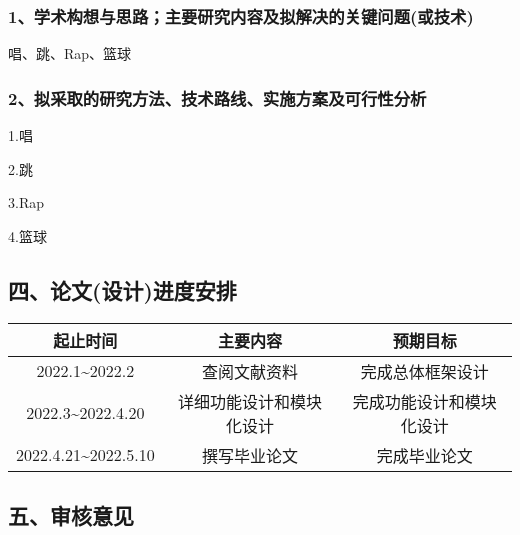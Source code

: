 \documentclass[UTF8,zihao=-4]{oucart}
\begin{document}
    \begin{framed}


        \subsubsection*{1、学术构想与思路；主要研究内容及拟解决的关键问题(或技术)}

        唱、跳、Rap、篮球

        \subsubsection*{2、拟采取的研究方法、技术路线、实施方案及可行性分析}

        1.唱

        2.跳

        3.Rap

        4.篮球
    \end{framed}

    \newpage

    \subsection*{四、论文(设计)进度安排}

    \noindent
    \begin{tabular}{|c|c|c|}
        \hline
        起止时间                   & 主要内容         & 预期目标         \\
        \hline
        2022.1\~{}2022.2       & 查阅文献资料       & 完成总体框架设计     \\
        \hline
        2022.3\~{}2022.4.20    & 详细功能设计和模块化设计 & 完成功能设计和模块化设计 \\
        \hline
        2022.4.21\~{}2022.5.10 & 撰写毕业论文       & 完成毕业论文       \\
        \hline
    \end{tabular}

    \subsection*{五、审核意见}

    \begin{framed}
        \vspace{50mm}
        \begin{flushright}
            \par
            \makebox[10mm]{}\par
        \end{flushright}
    \end{framed}
\end{document}
